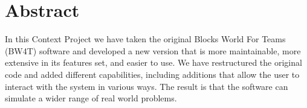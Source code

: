 \chapter*{Abstract}

In this Context Project we have taken the original Blocks World For Teams (BW4T) software and developed a new version that is more maintainable, more extensive in its features set, and easier to use. We have restructured the original code and added different capabilities, including additions that allow the user to interact with the system in various ways. The result is that the software can simulate a wider range of real world problems.